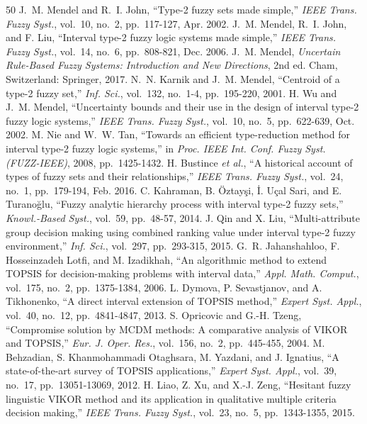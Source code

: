 \documentclass[journal,10pt,twocolumn]{IEEEtran}
\begin{document}
\begin{thebibliography}{50}
J.~M. Mendel and R.~I. John, ``Type-2 fuzzy sets made simple,'' \emph{IEEE Trans. Fuzzy Syst.}, vol.\ 10, no.\ 2, pp.\ 117-127, Apr. 2002.
J.~M. Mendel, R.~I. John, and F. Liu, ``Interval type-2 fuzzy logic systems made simple,'' \emph{IEEE Trans. Fuzzy Syst.}, vol.\ 14, no.\ 6, pp.\ 808-821, Dec. 2006.
J.~M. Mendel, \emph{Uncertain Rule-Based Fuzzy Systems: Introduction and New Directions}, 2nd ed. Cham, Switzerland: Springer, 2017.
N.~N. Karnik and J.~M. Mendel, ``Centroid of a type-2 fuzzy set,'' \emph{Inf. Sci.}, vol.\ 132, no.\ 1-4, pp.\ 195-220, 2001.
H. Wu and J.~M. Mendel, ``Uncertainty bounds and their use in the design of interval type-2 fuzzy logic systems,'' \emph{IEEE Trans. Fuzzy Syst.}, vol.\ 10, no.\ 5, pp.\ 622-639, Oct. 2002.
M. Nie and W.~W. Tan, ``Towards an efficient type-reduction method for interval type-2 fuzzy logic systems,'' in \emph{Proc. IEEE Int. Conf. Fuzzy Syst. (FUZZ-IEEE)}, 2008, pp.\ 1425-1432.
H. Bustince \emph{et al.}, ``A historical account of types of fuzzy sets and their relationships,'' \emph{IEEE Trans. Fuzzy Syst.}, vol.\ 24, no.\ 1, pp.\ 179-194, Feb. 2016.
C. Kahraman, B. \"Oztay\c{s}i, \.{I}. U\c{c}al Sari, and E. Turano\u{g}lu, ``Fuzzy analytic hierarchy process with interval type-2 fuzzy sets,'' \emph{Knowl.-Based Syst.}, vol.\ 59, pp.\ 48-57, 2014.
J. Qin and X. Liu, ``Multi-attribute group decision making using combined ranking value under interval type-2 fuzzy environment,'' \emph{Inf. Sci.}, vol.\ 297, pp.\ 293-315, 2015.
G.~R. Jahanshahloo, F. Hosseinzadeh Lotfi, and M. Izadikhah, ``An algorithmic method to extend TOPSIS for decision-making problems with interval data,'' \emph{Appl. Math. Comput.}, vol.\ 175, no.\ 2, pp.\ 1375-1384, 2006.
L. Dymova, P. Sevastjanov, and A. Tikhonenko, ``A direct interval extension of TOPSIS method,'' \emph{Expert Syst. Appl.}, vol.\ 40, no.\ 12, pp.\ 4841-4847, 2013.
S. Opricovic and G.-H. Tzeng, ``Compromise solution by MCDM methods: A comparative analysis of VIKOR and TOPSIS,'' \emph{Eur. J. Oper. Res.}, vol.\ 156, no.\ 2, pp.\ 445-455, 2004.
M. Behzadian, S. Khanmohammadi Otaghsara, M. Yazdani, and J. Ignatius, ``A state-of-the-art survey of TOPSIS applications,'' \emph{Expert Syst. Appl.}, vol.\ 39, no.\ 17, pp.\ 13051-13069, 2012.
H. Liao, Z. Xu, and X.-J. Zeng, ``Hesitant fuzzy linguistic VIKOR method and its application in qualitative multiple criteria decision making,'' \emph{IEEE Trans. Fuzzy Syst.}, vol.\ 23, no.\ 5, pp.\ 1343-1355, 2015.

\end{thebibliography}
\end{document}
